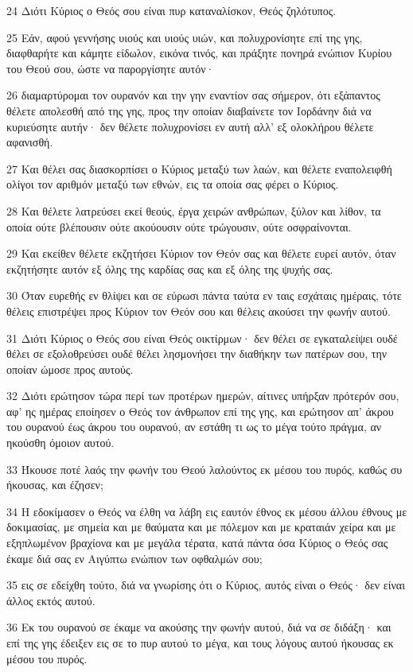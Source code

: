 \par 24 Διότι Κύριος ο Θεός σου είναι πυρ καταναλίσκον, Θεός ζηλότυπος.
\par 25 Εάν, αφού γεννήσης υιούς και υιούς υιών, και πολυχρονίσητε επί της γης, διαφθαρήτε και κάμητε είδωλον, εικόνα τινός, και πράξητε πονηρά ενώπιον Κυρίου του Θεού σου, ώστε να παροργίσητε αυτόν·
\par 26 διαμαρτύρομαι τον ουρανόν και την γην εναντίον σας σήμερον, ότι εξάπαντος θέλετε απολεσθή από της γης, προς την οποίαν διαβαίνετε τον Ιορδάνην διά να κυριεύσητε αυτήν· δεν θέλετε πολυχρονίσει εν αυτή αλλ' εξ ολοκλήρου θέλετε αφανισθή.
\par 27 Και θέλει σας διασκορπίσει ο Κύριος μεταξύ των λαών, και θέλετε εναπολειφθή ολίγοι τον αριθμόν μεταξύ των εθνών, εις τα οποία σας φέρει ο Κύριος.
\par 28 Και θέλετε λατρεύσει εκεί θεούς, έργα χειρών ανθρώπων, ξύλον και λίθον, τα οποία ούτε βλέπουσιν ούτε ακούουσιν ούτε τρώγουσιν, ούτε οσφραίνονται.
\par 29 Και εκείθεν θέλετε εκζητήσει Κύριον τον Θεόν σας και θέλετε ευρεί αυτόν, όταν εκζητήσητε αυτόν εξ όλης της καρδίας σας και εξ όλης της ψυχής σας.
\par 30 Όταν ευρεθής εν θλίψει και σε εύρωσι πάντα ταύτα εν ταις εσχάταις ημέραις, τότε θέλεις επιστρέψει προς Κύριον τον Θεόν σου και θέλεις ακούσει την φωνήν αυτού.
\par 31 Διότι Κύριος ο Θεός σου είναι Θεός οικτίρμων· δεν θέλει σε εγκαταλείψει ουδέ θέλει σε εξολοθρεύσει ουδέ θέλει λησμονήσει την διαθήκην των πατέρων σου, την οποίαν ώμοσε προς αυτούς.
\par 32 Διότι ερώτησον τώρα περί των προτέρων ημερών, αίτινες υπήρξαν πρότερόν σου, αφ' ης ημέρας εποίησεν ο Θεός τον άνθρωπον επί της γης, και ερώτησον απ' άκρου του ουρανού έως άκρου του ουρανού, αν εστάθη τι ως το μέγα τούτο πράγμα, αν ηκούσθη όμοιον αυτού.
\par 33 Ήκουσε ποτέ λαός την φωνήν του Θεού λαλούντος εκ μέσου του πυρός, καθώς συ ήκουσας, και έζησεν;
\par 34 Η εδοκίμασεν ο Θεός να έλθη να λάβη εις εαυτόν έθνος εκ μέσου άλλου έθνους με δοκιμασίας, με σημεία και με θαύματα και με πόλεμον και με κραταιάν χείρα και με εξηπλωμένον βραχίονα και με μεγάλα τέρατα, κατά πάντα όσα Κύριος ο Θεός σας έκαμε διά σας εν Αιγύπτω ενώπιον των οφθαλμών σου;
\par 35 εις σε εδείχθη τούτο, διά να γνωρίσης ότι ο Κύριος, αυτός είναι ο Θεός· δεν είναι άλλος εκτός αυτού.
\par 36 Εκ του ουρανού σε έκαμε να ακούσης την φωνήν αυτού, διά να σε διδάξη· και επί της γης έδειξεν εις σε το πυρ αυτού το μέγα, και τους λόγους αυτού ήκουσας εκ μέσου του πυρός.
